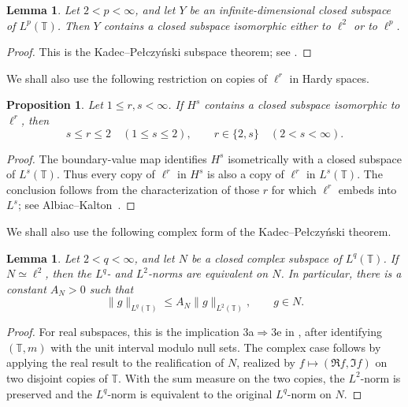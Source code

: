 \documentclass[10pt,a4paper]{amsart}
\newtheorem{lemma}[theorem]{Lemma}
\newtheorem{proposition}[theorem]{Proposition}
\newcommand{\T}{\mathbb{T}}
\begin{document}
\begin{lemma}
\label{lem:kp-subspace}
Let \(2<p<\infty\), and let \(Y\) be an infinite-dimensional closed
subspace of \(L^p(\T)\). Then \(Y\) contains a closed subspace
isomorphic either to \(\ell^2\) or to \(\ell^p\).
\end{lemma}

\begin{proof}
This is the Kadec--Pe{\l}czy\'nski subspace theorem; see
\cite[Corollary~2, p.~168]{KadecPelczynski1962}.
\end{proof}

We shall also use the following restriction on copies of \(\ell^r\)
in Hardy spaces.

\begin{proposition}
\label{prop:ambient-ellr}
Let \(1\le r,s<\infty\). If \(H^s\) contains a closed subspace
isomorphic to \(\ell^r\), then
\[
        s\le r\le2 \quad (1\le s\le2),
        \qquad
        r\in\{2,s\} \quad (2<s<\infty).
\]
\end{proposition}

\begin{proof}
The boundary-value map identifies \(H^s\) isometrically with a closed
subspace of \(L^s(\T)\). Thus every copy of \(\ell^r\) in \(H^s\)
is also a copy of \(\ell^r\) in \(L^s(\T)\). The conclusion follows
from the characterization of those \(r\) for which \(\ell^r\)
embeds into \(L^s\); see
Albiac--Kalton~\cite[Theorem~6.4.19]{AlbiacKalton2016}.
\end{proof}

We shall also use the following complex form of the
Kadec--Pe{\l}czy\'nski theorem.

\begin{lemma}
\label{lem:kp-hilbert}
Let \(2<q<\infty\), and let \(N\) be a closed complex subspace of
\(L^q(\T)\). If \(N\simeq\ell^2\), then the \(L^q\)- and
\(L^2\)-norms are equivalent on \(N\). In particular, there is a
constant \(A_N>0\) such that
\[
        \|g\|_{L^q(\T)}
        \le
        A_N\|g\|_{L^2(\T)},
        \qquad
        g\in N.
\]
\end{lemma}

\begin{proof}
For real subspaces, this is the implication
\textup{3a}\(\Rightarrow\)\textup{3e} in
\cite[Theorem~3, pp.~166--167]{KadecPelczynski1962},
after identifying \((\T,m)\) with the unit interval modulo null sets.
The complex case follows by applying the real result to the
realification of \(N\), realized by
\(f\mapsto(\Re f,\Im f)\) on two disjoint copies of \(\T\).
With the sum measure on the two copies, the \(L^2\)-norm is preserved
and the \(L^q\)-norm is equivalent to the original \(L^q\)-norm on
\(N\).
\end{proof}
\end{document}
